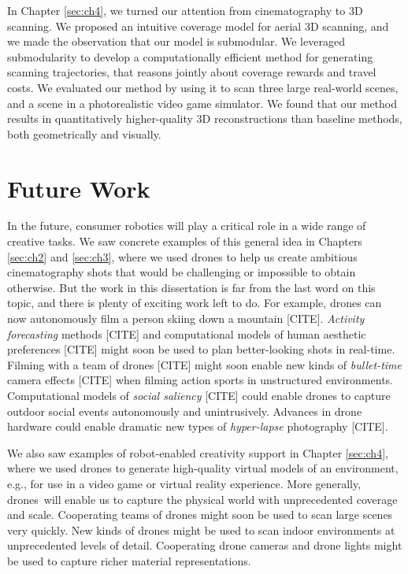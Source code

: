 In Chapter \ref{sec:ch4}, we turned our attention from cinematography to 3D scanning.
We proposed an intuitive coverage model for aerial 3D scanning, and we made the observation that our model is submodular.
We leveraged submodularity to develop a computationally efficient method for generating scanning trajectories, that reasons jointly about coverage rewards and travel costs.
We evaluated our method by using it to scan three large real-world scenes, and a scene in a photorealistic video game simulator.
We found that our method results in quantitatively higher-quality 3D reconstructions than baseline methods, both geometrically and visually.

\section{Future Work}

In the future, consumer robotics will play a critical role in a wide range of creative tasks. 
We saw concrete examples of this general idea in Chapters \ref{sec:ch2} and \ref{sec:ch3}, where we used drones to help us create ambitious cinematography shots that would be challenging or impossible to obtain otherwise.
But the work in this dissertation is far from the last word on this topic, and there is plenty of exciting work left to do.
For example, drones can now autonomously film a person skiing down a mountain [CITE].
\emph{Activity forecasting} methods [CITE] and computational models of human aesthetic preferences [CITE] might soon be used to plan better-looking shots in real-time.
Filming with a team of drones [CITE] might soon enable new kinds of \emph{bullet-time} camera effects [CITE] when filming action sports in unstructured environments. Computational models of \emph{social saliency} [CITE] could enable drones to capture outdoor social events autonomously and unintrusively.
Advances in drone hardware could enable dramatic new types of \emph{hyper-lapse} photography [CITE].

We also saw examples of robot-enabled creativity support in Chapter \ref{sec:ch4}, where we used drones to generate high-quality virtual models of an environment, e.g., for use in a video game or virtual reality experience.
More generally, drones\ will enable us to capture the physical world with unprecedented coverage and scale.
Cooperating teams of drones might soon be used to scan large scenes very quickly.
New kinds of drones might be used to scan indoor environments at unprecedented levels of detail. Cooperating drone cameras and drone lights might be used to capture richer material representations.

